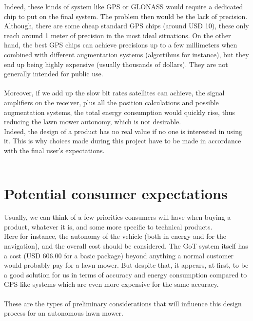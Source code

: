 \noindent
Indeed, these kinds of system like GPS or GLONASS would require a dedicated chip to put on the final system. The problem then would be the lack of precision. Although, there are some cheap standard GPS chips (around USD 10), these only reach around 1 meter of precision in the most ideal situations. %
On the other hand, the best GPS chips can achieve precisions up to a few millimeters when combined with different augmentation systems (algortihms for instance), but they end up being highly expensive (usually thousands of dollars). They are not generally intended for public use.
 \\\\
\noindent
Moreover, if we add up the slow bit rates satellites can achieve, the signal amplifiers on the receiver, plus all the position calculations and possible augmentation systems, the total energy consumption would quickly rise, thus reducing the lawn mower autonomy, which is not desirable.\\
Indeed, the design of a product has no real value if no one is interested in using it. This is why choices made during this project have to be made in accordance with the final user's expectations.\\\\
\section{Potential consumer expectations}
Usually, we can think of a few priorities consumers will have when buying a product, whatever it is, and some more specific to technical products.\\
\noindent
Here for instance, the autonomy of the vehicle (both in energy and for the navigation), and the overall cost should be considered. The GoT system itself has a cost (USD 606.00 for a basic package) beyond anything a normal customer would probably pay for a lawn mower. But despite that, it appears, at first, to be a good solution for us in terms of accuracy and energy consumption compared to GPS-like systems which are even more expensive for the same accuracy.  \\\\
\noindent
These are the types of preliminary considerations that will influence this design process for an autonomous lawn mower.